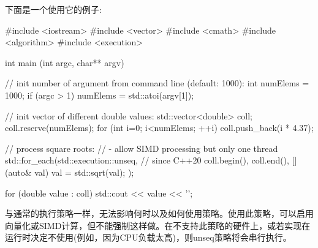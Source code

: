 下面是一个使用它的例子:


\begin{cpp}
#include <iostream>
#include <vector>
#include <cmath>
#include <algorithm>
#include <execution>

int main (int argc, char** argv)
{
	// init number of argument from command line (default: 1000):
	int numElems = 1000;
	if (argc > 1) {
		numElems = std::atoi(argv[1]);
	}
	
	// init vector of different double values:
	std::vector<double> coll;
	coll.reserve(numElems);
	for (int i=0; i<numElems; ++i) {
		coll.push_back(i * 4.37);
	}
	
	// process square roots:
	// - allow SIMD processing but only one thread
	std::for_each(std::execution::unseq, // since C++20
				  coll.begin(), coll.end(),
				  [](auto& val) {
					val = std::sqrt(val);
				  });
				  
	for (double value : coll) {
		std::cout << value << '\n';
	}
}
\end{cpp}

与通常的执行策略一样，无法影响何时以及如何使用策略。使用此策略，可以启用向量化或SIMD计算，但不能强制这样做。在不支持此策略的硬件上，或若实现在运行时决定不使用(例如，因为CPU负载太高)，则unseq策略将会串行执行。




















